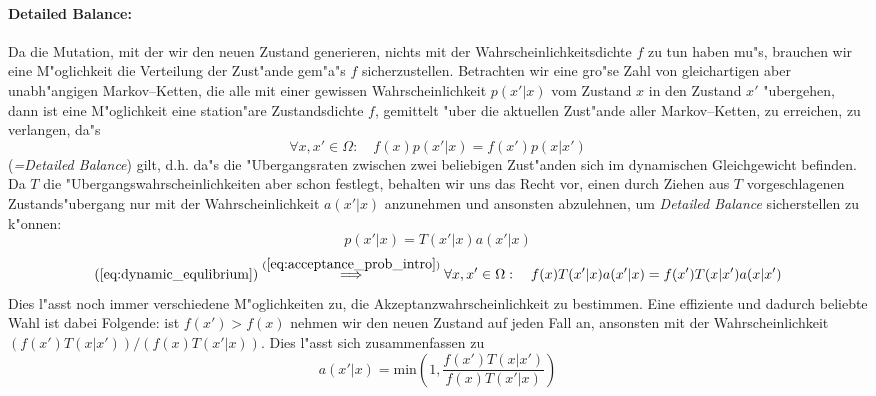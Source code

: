	\paragraph{Detailed Balance:}
	Da die Mutation, mit der wir den neuen Zustand generieren, nichts mit der Wahrscheinlichkeitsdichte $f$ zu tun haben mu"s, brauchen wir eine M"oglichkeit die Verteilung der Zust"ande gem"a"s $f$ sicherzustellen.
	Betrachten wir eine gro"se Zahl von gleichartigen aber unabh"angigen Markov--Ketten, die alle mit einer gewissen Wahrscheinlichkeit $p(x'|x)$ vom Zustand $x$ in den Zustand $x'$ "ubergehen, dann ist eine M"oglichkeit eine station"are Zustandsdichte $f$, gemittelt "uber die aktuellen Zust"ande aller Markov--Ketten, zu erreichen, zu verlangen, da"s
	\begin{equation}
		\forall x,x' \in \Omega :\quad f(x)p(x'|x) = f(x')p(x|x')
		\label{eq:dynamic_equlibrium}
	\end{equation}
	({\em =Detailed Balance}) gilt, d.h. da"s die "Ubergangsraten zwischen zwei beliebigen Zust"anden sich im dynamischen Gleichgewicht befinden.
	Da $T$ die "Ubergangswahrscheinlichkeiten aber schon festlegt, behalten wir uns das Recht vor, einen durch Ziehen aus $T$ vorgeschlagenen Zustands"ubergang nur mit der Wahrscheinlichkeit $a(x'|x)$ anzunehmen und ansonsten abzulehnen,	um {\em Detailed Balance} sicherstellen zu k"onnen:
	\begin{equation}
		p(x'|x) = T(x'|x)a(x'|x)
		\label{eq:acceptance_prob_intro}
	\end{equation}
	\begin{equation}
		(\ref{eq:dynamic_equlibrium}) \stackrel{(\ref{eq:acceptance_prob_intro})}{\Longrightarrow}
		\forall x,x' \in \Omega :\quad f(x)T(x'|x)a(x'|x) = f(x')T(x|x')a(x|x')
		\label{eq:detailedbalance}
	\end{equation}
	Dies l"asst noch immer verschiedene M"oglichkeiten zu, die Akzeptanzwahrscheinlichkeit zu bestimmen. Eine effiziente und dadurch beliebte Wahl ist dabei Folgende: ist $f(x')>f(x)$ nehmen wir den neuen Zustand auf jeden Fall an, ansonsten mit der Wahrscheinlichkeit $(f(x')T(x|x'))/(f(x)T(x'|x))$. Dies l"asst sich zusammenfassen zu
	\begin{equation}
		a(x'|x)=\text{min}\left(1,\frac{f(x')T(x|x')}{f(x)T(x'|x)}\right)
		\label{eq:acceptanceratio}
	\end{equation}
	
	
